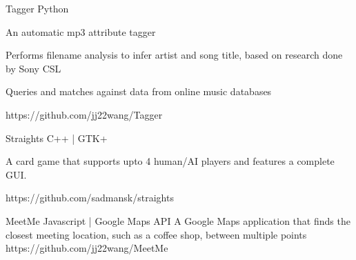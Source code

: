



\begin{cvprojects}

\cvproject
{Tagger}
{Python}
{
An automatic mp3 attribute tagger
\begin{cvitems}
\item[]
\item {Performs filename analysis to infer artist and song title, based on research done by Sony CSL}
\item {Queries and matches against data from online music databases}
\end{cvitems}
}
{https://github.com/jj22wang/Tagger}


\cvproject
{Straights}
{C++ | GTK+}
{
    A card game that supports upto 4 human/AI players and features a complete GUI.
    \begin{cvitems}\end{cvitems} %
}
{https://github.com/sadmansk/straights}


\cvproject
{MeetMe}
{Javascript | Google Maps API}
{
A Google Maps application that finds the closest meeting location, such as a coffee shop, between multiple points
}
{https://github.com/jj22wang/MeetMe}

\end{cvprojects}
